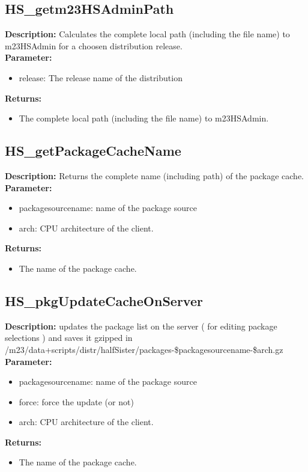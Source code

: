 \subsection{HS\_getm23HSAdminPath}
\textbf{Description:} Calculates the complete local path (including the file name) to m23HSAdmin for a choosen distribution release.\\
\textbf{Parameter:}
\begin{itemize}
\item release: The release name of the distribution
\end{itemize}
\textbf{Returns:}
\begin{itemize}
\item The complete local path (including the file name) to m23HSAdmin.
\end{itemize}

\subsection{HS\_getPackageCacheName}
\textbf{Description:} Returns the complete name (including path) of the package cache.\\
\textbf{Parameter:}
\begin{itemize}
\item packagesourcename: name of the package source
\item arch: CPU architecture of the client.
\end{itemize}
\textbf{Returns:}
\begin{itemize}
\item The name of the package cache.
\end{itemize}

\subsection{HS\_pkgUpdateCacheOnServer}
\textbf{Description:} updates the package list on the server ( for editing package selections ) and saves it gzipped in /m23/data+scripts/distr/halfSister/packages-\$packagesourcename-\$arch.gz\\
\textbf{Parameter:}
\begin{itemize}
\item packagesourcename: name of the package source
\item force: force the update (or not)
\item arch: CPU architecture of the client.
\end{itemize}
\textbf{Returns:}
\begin{itemize}
\item The name of the package cache.
\end{itemize}

